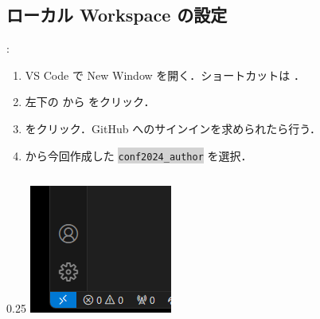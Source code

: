 \documentclass[aspectratio=169,dvipdfmx,cjk]{beamer}
\newcommand{\cmdline}[1]{
    \colorbox{lightgray}{\lstinline[style=command]{#1}}
}
\begin{document}
\subsection{ローカル Workspace の設定}
\begin{frame}{\insertsection \thesubsection: \insertsubsection}
  \begin{enumerate}
    \item VS Code で New Window を開く．ショートカットは ．
    \item 左下の\beamerbutton{$><$} から  をクリック．
    \item {} をクリック．GitHub へのサインインを求められたら行う\cite{GitHubAuthentication}．
    \item {} から今回作成した \cmdline{conf2024_author} を選択．
  \end{enumerate}
  \begin{columns}
    \begin{column}{0.25\textwidth}
        \includegraphics[width=1.0\linewidth]{fig/connect.png}
    \end{column}
    \begin{column}{0.3\textwidth}

\end{column}
\end{columns}
\end{frame}
\end{document}

